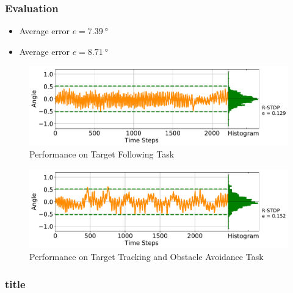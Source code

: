 \begin{frame}
	\frametitle{Evaluation}
	\begin{itemize}
		\item <1-> Average error $ e = \SI{7,39}{\degree}$
		\item <2-> Average error $ e = \SI{8.71}{\degree}$
	\end{itemize}
	\begin{overprint}
		\begin{figure}
			\centering
			\includegraphics[width=\textwidth]{img/performance_tf.pdf}
			\caption{Performance on Target Following Task}
			\label{fig:Performance_tf}
		\end{figure}
		\begin{figure}
			\centering
			\includegraphics[width=\textwidth]{img/performance_oa.pdf}
			\caption{Performance on Target Tracking and Obstacle Avoidance Task}
			\label{fig:Performance_oa}
		\end{figure}
	\end{overprint}
\end{frame}

\begin{frame}
	\frametitle{title}
\end{frame}
